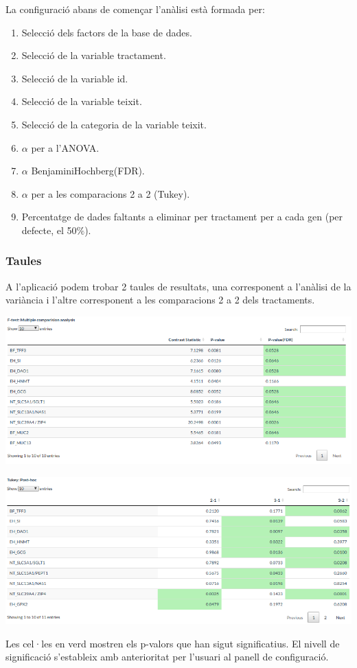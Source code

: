 \documentclass[english]{article}
\begin{document}
La configuració abans de comen\c{c}ar l'anàlisi està formada per:
\begin{enumerate}
\item Selecció dels factors de la base de dades.
\item Selecció de la variable tractament.
\item Selecció de la variable id.
\item Selecció de la variable teixit.
\item Selecció de la categoria de la variable teixit.
\item $\alpha$ per a l'ANOVA.
\item $\alpha$ BenjaminiHochberg(FDR).
\item $\alpha$ per a les comparacions 2 a 2 (Tukey).
\item Percentatge de dades faltants a eliminar per tractament per a cada gen (per defecte, el 50$\%$).
\end{enumerate}
\newpage
\subsubsection{Taules}
A l'aplicació podem trobar 2 taules de resultats, una corresponent a l'anàlisi de la variància i l'altre corresponent a les comparacions 2 a 2 dels tractaments.
\begin{center}
\includegraphics[scale=0.3]{app3.png}
\end{center}
\begin{center}
\includegraphics[scale=0.3]{app4.png}
\end{center}
Les cel·les en verd mostren els p-valors que han sigut significatius. El nivell de significació s'estableix amb anterioritat per l'usuari al panell de configuració.
\end{document}

